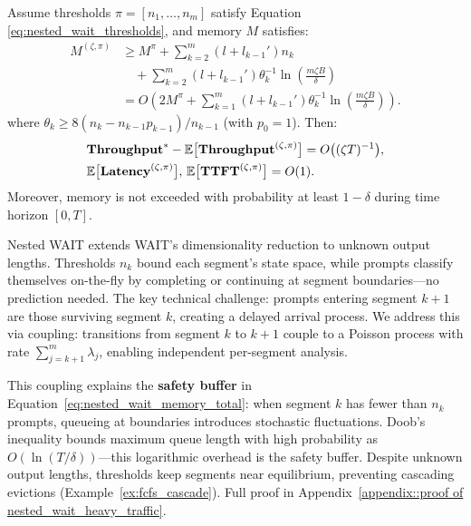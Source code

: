 \begin{theorem}
\label{thm:nested_wait_heavy_traffic}
Assume thresholds \( \pi = [n_1, \dots, n_m] \) satisfy Equation \eqref{eq:nested_wait_thresholds}, and memory \( M \) satisfies:
\begin{equation}
    \label{eq:nested_wait_memory_total}
\begin{aligned}
    M^{(\zeta,\pi)} &\geq M^\pi + \sum_{k=2}^m (l + l_{k-1}') n_k \\
    &\quad + \sum_{k=2}^m (l + l_{k-1}') \theta_k^{-1} \ln\left( \frac{m \zeta B}{\delta} \right) \\
    &= O\left( 2M^\pi + \sum_{k=1}^m (l + l_{k-1}') \theta_k^{-1}\ln\left( \frac{m \zeta B}{\delta} \right) \right).
\end{aligned}
\end{equation}
where $\theta_k \geq 8(n_k - n_{k-1}p_{k-1})/n_{k-1}$ (with $p_0 = 1$). Then:
$$
    \begin{aligned}
        &\textbf{Throughput}^* - \mathbb{E}\big[ \textbf{Throughput}^{(\zeta, \pi)} \big] 
   = O\big( (\zeta T)^{-1} \big), \\
&\mathbb{E}\big[ \textbf{Latency}^{(\zeta, \pi)} \big],\,\mathbb{E}\big[ \textbf{TTFT}^{(\zeta, \pi)} \big] = O(1).
    \end{aligned}
$$
Moreover, memory is not exceeded with probability at least \( 1 - \delta \) during time horizon $[0,T].$
\end{theorem}

Nested WAIT extends WAIT's dimensionality reduction to unknown output lengths. Thresholds $n_k$ bound each segment's state space, while prompts classify themselves on-the-fly by completing or continuing at segment boundaries—no prediction needed. The key technical challenge: prompts entering segment $k+1$ are those surviving segment $k$, creating a delayed arrival process. We address this via coupling: transitions from segment $k$ to $k+1$ couple to a Poisson process with rate $\sum_{j=k+1}^m \lambda_j$, enabling independent per-segment analysis.

This coupling explains the \textbf{safety buffer} in Equation~\eqref{eq:nested_wait_memory_total}: when segment $k$ has fewer than $n_k$ prompts, queueing at boundaries introduces stochastic fluctuations. Doob's inequality bounds maximum queue length with high probability as $O(\ln(T/\delta))$—this logarithmic overhead is the safety buffer. Despite unknown output lengths, thresholds keep segments near equilibrium, preventing cascading evictions (Example~\ref{ex:fcfs_cascade}). Full proof in Appendix~\ref{appendix::proof of nested_wait_heavy_traffic}.


